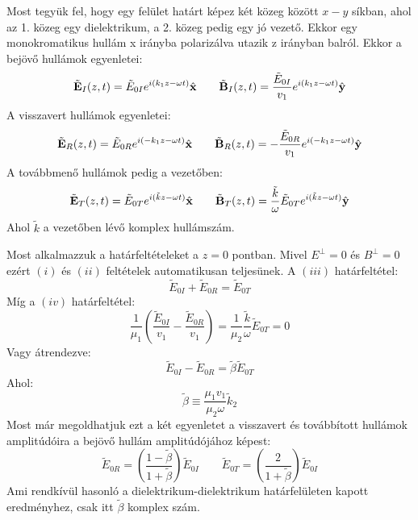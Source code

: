 \documentclass[../main.tex]{subfiles}
\begin{document}
Most tegyük fel, hogy egy felület határt képez két közeg között $x-y$ síkban, ahol az 1. közeg egy dielektrikum, a 2. közeg pedig egy jó vezető. Ekkor egy monokromatikus hullám x irányba polarizálva utazik
z irányban balról. Ekkor a bejövő hullámok egyenletei:
\begin{equation}
    \tilde{\bold{E}}_I(z, t) = \tilde{E}_{0I} e^{i(k_1 z - \omega t)} \hat{\bold{x}} \qquad \tilde{\bold{B}}_I(z, t) = \frac{\tilde{E}_{0I}}{v_1} e^{i(k_1 z - \omega t)} \hat{\bold{y}}
\end{equation}
A visszavert hullámok egyenletei:
\begin{equation}
    \tilde{\bold{E}}_R(z, t) = \tilde{E}_{0R} e^{i(-k_1 z - \omega t)} \hat{\bold{x}} \qquad \tilde{\bold{B}}_R(z, t) = -\frac{\tilde{E}_{0R}}{v_1} e^{i(-k_1 z - \omega t)} \hat{\bold{y}}
\end{equation}
A továbbmenő hullámok pedig a vezetőben:
\begin{equation}
    \tilde{\bold{E}}_T(z, t) = \tilde{E}_{0T} e^{i(\tilde{k}z - \omega t)} \hat{\bold{x}} \qquad \tilde{\bold{B}}_T(z, t) = \frac{\tilde{k}}{\omega} \tilde{E}_{0T} e^{i(\tilde{k}z - \omega t)} \hat{\bold{y}}
\end{equation}
Ahol $\tilde{k}$ a vezetőben lévő komplex hullámszám.

Most alkalmazzuk a határfeltételeket a $z = 0$ pontban. Mivel $E^{\perp} = 0$ és $B^\perp = 0$ ezért $(i)$ és $(ii)$ feltételek automatikusan teljesünek. A $(iii)$ határfeltétel:
\begin{equation}
    \tilde{E}_{0I} + \tilde{E}_{0R} = \tilde{E}_{0T}
\end{equation}
Míg a $(iv)$ határfeltétel:
\begin{equation}
    \frac{1}{\mu_1} \left( \frac{\tilde{E}_{0I}}{v_1} - \frac{\tilde{E}_{0R}}{v_1} \right) = \frac{1}{\mu_2} \frac{\tilde{k}}{\omega} \tilde{E}_{0T} = 0
\end{equation}
Vagy átrendezve:
\begin{equation}
    \tilde{E}_{0I} - \tilde{E}_{0R} = \tilde{\beta} \tilde{E}_{0T}
\end{equation}
Ahol:
\begin{equation}
    \tilde{\beta} \equiv \frac{\mu_1 v_1}{\mu_2 \omega} \tilde{k}_2
\end{equation}
Most már megoldhatjuk ezt a két egyenletet a visszavert és továbbított hullámok amplitúdóira a bejövő hullám amplitúdójához képest:
\begin{equation}
    \boxed{\tilde{E}_{0R} = \left( \frac{1 - \tilde{\beta}}{1 + \tilde{\beta}} \right) \tilde{E}_{0I} \qquad \tilde{E}_{0T} = \left( \frac{2}{1 + \tilde{\beta}} \right) \tilde{E}_{0I}}
\end{equation}
Ami rendkívül hasonló a dielektrikum-dielektrikum határfelületen kapott eredményhez, csak itt $\tilde{\beta}$ komplex szám.
\end{document}
